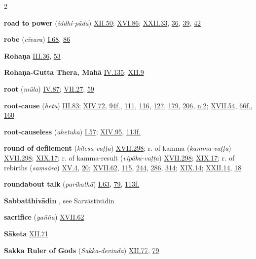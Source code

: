 \begin{multicols}{2}
\begin{vismHanging}
\par\textbf{road to power} (\emph{iddhi-pāda}) \hyperlink{XII.50}{XII.50}{}; \hyperlink{XVI.86}{XVI.86}{}; \hyperlink{XXII.33}{XXII.33}{}, \hyperlink{XXII.36}{36}{}, \hyperlink{XXII.39}{39}{}, \hyperlink{XXII.42}{42}{}
\par\textbf{robe} (\emph{cīvara}) \hyperlink{I.68}{I.68}{}, \hyperlink{I.86}{86}{}
\par\textbf{Rohaṇa} \hyperlink{III.36}{III.36}{}, \hyperlink{III.53}{53}{}
\par\textbf{Rohaṇa-Gutta Thera, Mahā} \hyperlink{IV.135}{IV.135}{}; \hyperlink{XII.9}{XII.9}{}
\par\textbf{root} (\emph{mūla}) \hyperlink{IV.87}{IV.87}{}; \hyperlink{VII.27}{VII.27}{}, \hyperlink{VII.59}{59}{}
\par\textbf{root-cause} (\emph{hetu}) \hyperlink{III.83}{III.83}{}; \hyperlink{XIV.72}{XIV.72}{}, \hyperlink{XIV.94}{94f.}{}, \hyperlink{XIV.111}{111}{}, \hyperlink{XIV.116}{116}{}, \hyperlink{XIV.127}{127}{}, \hyperlink{XIV.179}{179}{}, \hyperlink{XIV.206}{206}{}, \hyperlink{XIV.n2}{n.2}{}; \hyperlink{XVII.54}{XVII.54}{}, \hyperlink{XVII.66}{66f.}{}, \hyperlink{XVII.160}{160}{}
\par\textbf{root-causeless} (\emph{ahetuka}) \hyperlink{I.57}{I.57}{}; \hyperlink{XIV.95}{XIV.95}{}, \hyperlink{XIV.113}{113f.}{}
\par\textbf{round of defilement} (\emph{kilesa-vaṭṭa}) \hyperlink{XVII.298}{XVII.298}{}; r. of kamma (\emph{kamma-vaṭṭa}) \hyperlink{XVII.298}{XVII.298}{}; \hyperlink{XIX.17}{XIX.17}{}; r. of kamma-result (\emph{vipāka-vaṭṭa}) \hyperlink{XVII.298}{XVII.298}{}; \hyperlink{XIX.17}{XIX.17}{}; r. of rebirths (\emph{saṃsāra}) \hyperlink{XV.4}{XV.4}{}, \hyperlink{XV.20}{20}{}; \hyperlink{XVII.62}{XVII.62}{}, \hyperlink{XVII.115}{115}{}, \hyperlink{XVII.244}{244}{}, \hyperlink{XVII.286}{286}{}, \hyperlink{XVII.314}{314}{}; \hyperlink{XIX.14}{XIX.14}{}; \hyperlink{XXII.14}{XXII.14}{}, \hyperlink{XXII.18}{18}{}
\par\textbf{roundabout talk} (\emph{parikathā}) \hyperlink{I.63}{I.63}{}, \hyperlink{I.79}{79}{}, \hyperlink{I.113}{113f.}{}
\par\textbf{Sabbatthivādin} , see Sarvāstivādin
\par\textbf{sacrifice} (\emph{yañña}) \hyperlink{XVII.62}{XVII.62}{}
\par\textbf{Sāketa} \hyperlink{XII.71}{XII.71}{}
\par\textbf{Sakka Ruler of Gods} (\emph{Sakka-devinda}) \hyperlink{XII.77}{XII.77}{}, \hyperlink{XII.79}{79}{}

\end{vismHanging}
\end{multicols}
